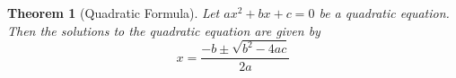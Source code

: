 \documentclass[addpoints,12pt]{exam}
\newtheorem{theorem}{Theorem}
\begin{document}
\begin{questions}

\end{questions}

\begin{theorem}[Quadratic Formula]
    Let $ax^{2}+bx +c =0$ be a quadratic equation. Then the solutions to the quadratic equation are given by 
		\[
			x = \frac{-b \pm \sqrt{b^{2} - 4ac}}{2a}
		\]
\end{theorem} \vfill
\end{document}
